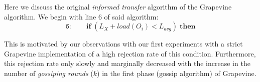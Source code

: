 Here we discuss the original \emph{informed transfer} algorithm of the
\textsf{Grapevine} algorithm. We begin with line 6 of said algorithm:
\[
\mathtt{6:} \qquad \mathrm{\mathbf{if}} \; (L_X + load(O_i) < L_{avg})
\; \mathrm{\mathbf{then}}
\]

This is motivated by our observations with our first experiments with
a strict \textsf{Grapevine} implementation of a high rejection rate of
this condition. Furthermore, this rejection rate only slowly and
marginally decreased with the increase in the number of
\emph{gossiping rounds} ($k$) in the first phase (gossip algorithm) of
\textsf{Grapevine}.



